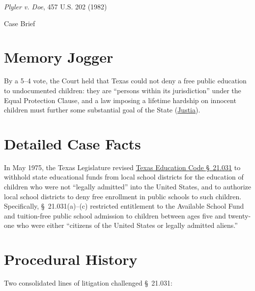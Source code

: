 \documentclass[12pt]{article}
\begin{document}
\begin{center}
{\LARGE \textit{Plyler v. Doe}, 457 U.S. 202 (1982)\par}
\vspace{0.8em}
{\large Case Brief\par}
\end{center}
\vspace{1em}

\section{Memory Jogger}
By a 5--4 vote, the Court held that Texas could not deny a free public education to undocumented children: they are ``persons within its jurisdiction'' under the Equal Protection Clause, and a law imposing a lifetime hardship on innocent children must further some substantial goal of the State (\href{https://supreme.justia.com/cases/federal/us/457/202/}{Justia}).

\section{Detailed Case Facts}
In May 1975, the Texas Legislature revised \href{https://www.law.cornell.edu/supremecourt/text/457/202}{Texas Education Code \S~21.031} to withhold state educational funds from local school districts for the education of children who were not ``legally admitted'' into the United States, and to authorize local school districts to deny free enrollment in public schools to such children. Specifically, \S~21.031(a)--(c) restricted entitlement to the Available School Fund and tuition-free public school admission to children between ages five and twenty-one who were either ``citizens of the United States or legally admitted aliens.''

\section{Procedural History}
Two consolidated lines of litigation challenged \S~21.031:
\end{document}
